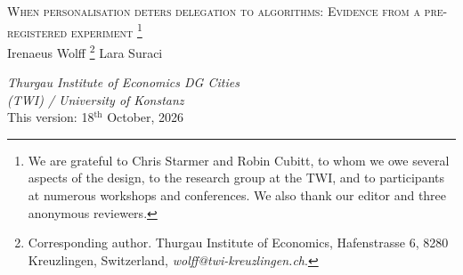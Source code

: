 \documentclass[a4paper, 12pt, fleqn]{article}
\title{\mytitle}
\date{}
\theoremstyle{hypstyle}
\newcommand{\symbolfootnote}[1]{\begingroup%
	\renewcommand{\thefootnote}{\fnsymbol{footnote}}\footnote{#1}\endgroup}
\newcommand{\mytitle}{{\Large \textsc{When personalisation deters delegation to algorithms: Evidence from a pre-registered experiment}}}
\begin{document}
	
	\thispagestyle{empty}
	\begin{center}
		\mytitle\symbolfootnote{We are grateful to Chris Starmer and Robin Cubitt, to whom we owe several aspects of the design, to the research group at the TWI, and to participants at numerous workshops and conferences. We also thank our editor and three anonymous reviewers.}
		\vspace{.25cm}\\
		Irenaeus Wolff\symbolfootnote{Corresponding author. Thurgau Institute of Economics, Hafenstrasse 6, 8280 Kreuzlingen, Switzerland, \textit{wolff@twi-kreuzlingen.ch}.} \qquad\qquad\qquad Lara Suraci
		\\\vspace{.15cm}
		\begin{small}
			\textit{Thurgau Institute of Economics\phantom{text} \qquad\qquad DG Cities\phantom{moretext} \\ (TWI) / University of Konstanz \qquad\qquad \phantom{moretext University} } 
			\vspace{.03cm}\\
			\vspace{.3cm}
			{This version: 18$^\text{th}$ October, 2026}
			\vspace{.3cm}
		\end{small}
	\end{center}
	
\end{document}

